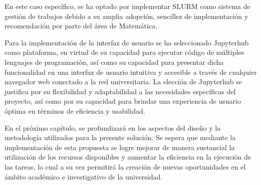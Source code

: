 \begin{spacing}{1.5}
\begin{multicols}{2}
En este caso específico, se ha optado por implementar SLURM como sistema de gestión de trabajos debido a su amplia adopción, sencillez de implementación y recomendación por parte del área de Matemática.

Para la implementación de la interfaz de usuario se ha seleccionado Jupyterhub como plataforma, en virtud de su capacidad para ejecutar código de múltiples lenguajes de programación, así como su capacidad para presentar dicha funcionalidad en una interfaz de usuario intuitiva y accesible a través de cualquier navegador web conectado a la red universitaria. La elección de Jupyterhub se justifica por su flexibilidad y adaptabilidad a las necesidades específicas del proyecto, así como por su capacidad para brindar una experiencia de usuario óptima en términos de eficiencia y usabilidad.

En el próximo capítulo, se profundizará en los aspectos del diseño y la metodología utilizados para la presente solución. Se espera que mediante la implementación de esta propuesta se logre mejorar de manera sustancial la utilización de los recursos disponibles y aumentar la eficiencia en la ejecución de las tareas, lo cual a su vez permitirá la creación de nuevas oportunidades en el ámbito académico e investigativo de la universidad.
\end{multicols}

\mylinespacing
\mylinespacing
\begin{tightcenter}
\end{tightcenter}
\end{spacing}
